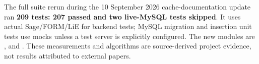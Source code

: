 The full suite rerun during the 10 September 2026 cache-documentation update ran \textbf{209 tests: 207 passed and
two live-MySQL tests skipped}. It uses actual Sage/FORM/LiE for backend tests;
MySQL migration and insertion unit tests use mocks unless a test server is
explicitly configured. The new modules are
, 
and . These measurements and algorithms
are source-derived project evidence, not results attributed to external papers.
